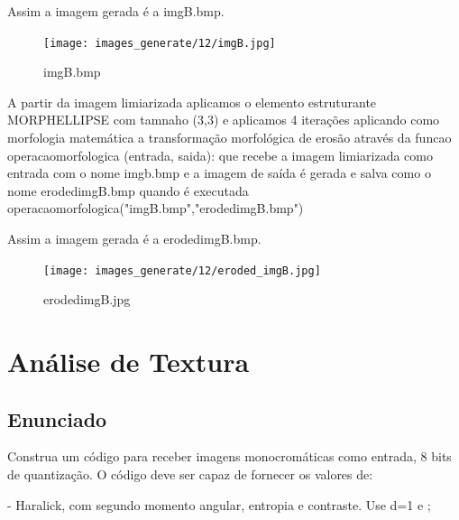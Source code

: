 \documentclass[10pt,a4paper]{article}
\begin{document}
\begin{flushleft}
Assim a imagem gerada é a imgB.bmp.
\end{flushleft}

\begin{figure}[H]
    \centering
    \texttt{[image: images\_generate/12/imgB.jpg]}
    \caption{imgB.bmp}
\end{figure}

\begin{flushleft}
A partir da imagem limiarizada aplicamos o elemento estruturante MORPH\textunderscore ELLIPSE com tamnaho (3,3) e aplicamos 4 iterações aplicando como morfologia matemática a transformação morfológica de erosão através da funcao {\ttfamily operacao\textunderscore morfologica (entrada, saida): } que recebe a imagem limiarizada como entrada com o nome imgb.bmp e a imagem de saída é gerada e salva como o nome eroded\textunderscore imgB.bmp quando é executada {\ttfamily operacao\undercose morfologica("imgB.bmp","eroded\textunderscore imgB.bmp")}
\end{flushleft}

\begin{flushleft}
Assim a imagem gerada é a eroded\textunderscore imgB.bmp.
\end{flushleft}

\begin{figure}[H]
    \centering
    \texttt{[image: images\_generate/12/eroded\_imgB.jpg]}
    \caption{eroded\textundercose imgB.jpg}
\end{figure}

\pagebreak

\section{Análise de Textura}

\subsection{Enunciado}

\begin{flushleft}
Construa um código para receber imagens monocromáticas como entrada, 8 bits de quantização. O código deve ser capaz de fornecer os valores de:
\end{flushleft}

\begin{flushleft}
- Haralick, com segundo momento angular, entropia e contraste. Use d=1 e ;
\end{flushleft}
\end{document}
